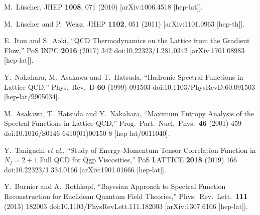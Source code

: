 \documentclass[a4paper,11pt]{article}
\begin{document}
\begin{thebibliography}{99}
  M.~L\"uscher,
  JHEP {\bf 1008}, 071 (2010)
  [arXiv:1006.4518 [hep-lat]].


  M.~L\"uscher and P.~Weisz,
  JHEP {\bf 1102}, 051 (2011)
  [arXiv:1101.0963 [hep-th]].



  E.~Itou and S.~Aoki,
  ``QCD Thermodynamics on the Lattice from the Gradient Flow,''
  PoS INPC {\bf 2016} (2017) 342
  doi:10.22323/1.281.0342
  [arXiv:1701.08983 [hep-lat]].


  
  Y.~Nakahara, M.~Asakawa and T.~Hatsuda,
  ``Hadronic Spectral Functions in Lattice QCD,''
  Phys.\ Rev.\ D {\bf 60} (1999) 091503
  doi:10.1103/PhysRevD.60.091503
  [hep-lat/9905034].



  M.~Asakawa, T.~Hatsuda and Y.~Nakahara,
  ``Maximum Entropy Analysis of the Spectral Functions in Lattice QCD,''
  Prog.\ Part.\ Nucl.\ Phys.\  {\bf 46} (2001) 459
  doi:10.1016/S0146-6410(01)00150-8
  [hep-lat/0011040].





  Y.~Taniguchi {\it et al.},
  ``Study of Energy-Momentum Tensor Correlation Function in $N_f=2+1$ Full QCD for Qgp Viscosities,''
  PoS LATTICE {\bf 2018} (2019) 166
  doi:10.22323/1.334.0166
  [arXiv:1901.01666 [hep-lat]].




  Y.~Burnier and A.~Rothkopf,
  ``Bayesian Approach to Spectral Function Reconstruction for Euclidean Quantum Field Theories,''
  Phys.\ Rev.\ Lett.\  {\bf 111} (2013) 182003
  doi:10.1103/PhysRevLett.111.182003
  [arXiv:1307.6106 [hep-lat]].



\end{thebibliography}
\end{document}
